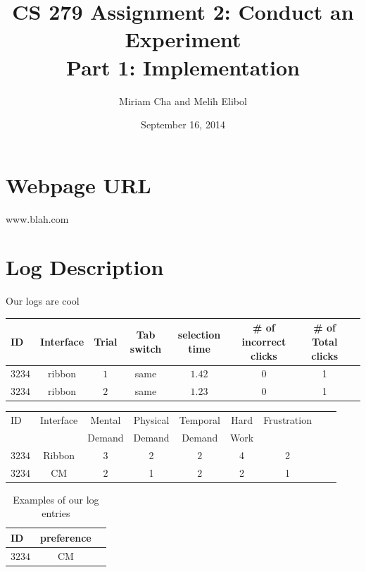 \documentclass{article}
\title{CS 279 Assignment 2: Conduct an Experiment\\Part 1: Implementation}
\author{Miriam Cha and Melih Elibol}
\date{September 16, 2014}
\begin{document}
\maketitle

\section*{Webpage URL}
 www.blah.com
\section*{Log Description} 
 Our logs are cool
 
\begin{table}[tbh]
  \centering
\begin{tabular}{|l|c|c|c|c|c|c|c|}
  \hline
 ID &  Interface  &  Trial &  Tab switch & selection time & \# of incorrect clicks & \# of Total clicks              \\\hline
 $3234$ &   ribbon  & $1$  & same  & $1.42$ & 0  &1 \\ \hline
$3234$  &    ribbon &   $2$ & same  & $1.23$ & 0 &1  \\\hline       
\end{tabular}
\end{table}

\begin{table}[tbh]
  \centering
\begin{tabular}{|l|c|c|c|c|c|c|c|c|}
  \hline
  ID &  Interface  & Mental 	&  Physical 	 &Temporal  	& Hard  & Frustration      \\      
       &                  & Demand	& Demand 	& Demand 	& Work		     &			\\\hline
$3234$ &   Ribbon  & $3$  & 2  & $2$ & 4  &2  \\ \hline
$3234$  &    CM &   $2$ & 1  & $2$ & 2 &1  \\\hline       
\end{tabular}
\end{table}

\begin{table}[tbh]
  \centering
\begin{tabular}{|l|c|c|}
  \hline
    ID               & preference                \\\hline
 $3234$ &   CM      \\ \hline
\end{tabular}
\caption{Examples of our log entries}
\end{table}
\end{document}
